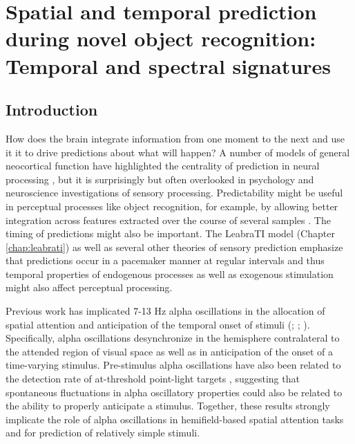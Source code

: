\documentclass[dwyatte_dissertation.tex]{subfiles}
\begin{document}
\sloppy

\chapter{Spatial and temporal prediction during novel object recognition: Temporal and spectral signatures}
\label{chap:pleast}

\section{Introduction}
How does the brain integrate information from one moment to the next and use it it to drive predictions about what will happen? A number of models of general neocortical function have highlighted the centrality of prediction in neural processing \cite[e.g.,]{DayanHintonNealEtAl95,RaoBallard99,LeeMumford03,Friston05,GeorgeHawkins09}, but it is surprisingly but often overlooked in psychology and neuroscience investigations of sensory processing. Predictability might be useful in perceptual processes like object recognition, for example, by allowing better integration across features extracted over the course of several samples \cite{Foldiak91,StringerPerryRollsEtAl06,WallisBaddeley97,IsikLeiboPoggio12}. The timing of predictions might also be important. The LeabraTI model (Chapter \ref{chap:leabrati}) as well as several other theories of sensory prediction \cite{ArnalGiraud12,GiraudPoeppel12} emphasize that predictions occur in a pacemaker manner at regular intervals and thus temporal properties of endogenous processes as well as exogenous stimulation might also affect perceptual processing.

Previous work has implicated 7-13 Hz alpha oscillations in the allocation of spatial attention and anticipation of the temporal onset of stimuli (; ; ). Specifically, alpha oscillations desynchronize in the hemisphere contralateral to the attended region of visual space as well as in anticipation of the onset of a time-varying stimulus. Pre-stimulus alpha oscillations have also been related to the detection rate of at-threshold point-light targets \cite{MathewsonGrattonFabianiEtAl09,BuschDuboisVanrullen09}, suggesting that spontaneous fluctuations in alpha oscillatory properties could also be related to the ability to properly anticipate a stimulus. Together, these results strongly implicate the role of alpha oscillations in hemifield-based spatial attention tasks and for prediction of relatively simple stimuli. 
\end{document}
